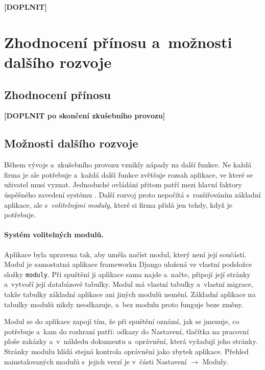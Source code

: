 \textbf{[DOPLNIT]} %

\section{Zhodnocení přínosu a~možnosti dalšího rozvoje}\label{sec:zhodnoceni}

\subsection{Zhodnocení přínosu}\label{sec:zhodnoceni-prinos}

\textbf{[DOPLNIT po skončení zkušebního provozu]} %

\subsection{Možnosti dalšího rozvoje}\label{sec:rozvoj}

Během vývoje a~zkušebního provozu vznikly nápady na další funkce. Ne každá firma je ale potřebuje a~každá další funkce zvětšuje rozsah aplikace, ve které se uživatel musí vyznat. Jednoduché ovládání přitom patří mezi hlavní faktory úspěšného zavedení systému \cite[s.~48]{Jordan2022}. Další rozvoj proto nepočítá s~rozšiřováním základní aplikace, ale s~\emph{volitelnými moduly}, které si firma přidá jen tehdy, když je potřebuje.

\paragraph{Systém volitelných modulů.} Aplikace byla upravena tak, aby uměla načíst modul, který není její součástí. Modul je samostatná aplikace frameworku Django uložená ve vlastní podsložce složky \texttt{moduly}. Při spuštění ji aplikace sama najde a~načte, připojí její stránky a~vytvoří její databázové tabulky. Modul má vlastní tabulky a~vlastní migrace, takže tabulky základní aplikace ani jiných modulů nemění. Základní aplikace na tabulky modulů nikdy neodkazuje, a~bez modulu proto funguje beze změny.

Modul se do aplikace zapojí tím, že při spuštění oznámí, jak se jmenuje, co potřebuje a~kam do rozhraní patří: odkazy do Nastavení, tlačítka na pracovní ploše zakázky a~v~náhledu dokumentu a~oprávnění, která vyžadují jeho stránky. Stránky modulu hlídá stejná kontrola oprávnění jako zbytek aplikace. Přehled nainstalovaných modulů s~jejich verzí je v~části Nastavení $\rightarrow$ Moduly.

